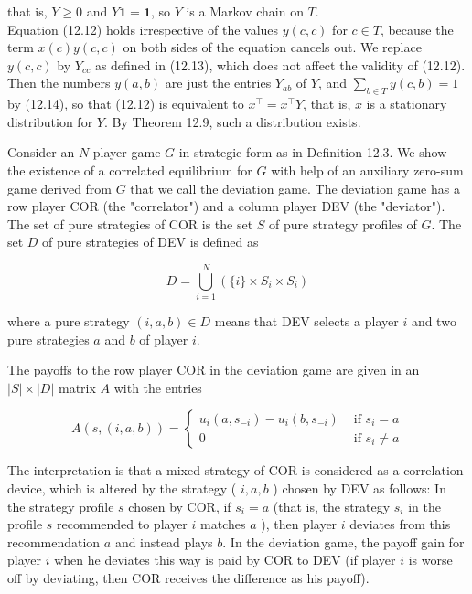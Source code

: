 \documentclass[12pt]{article}
\begin{document}
that is, $Y \geq 0$ and $Y \mathbf{1}=\mathbf{1}$, so $Y$ is a Markov chain on $T$.\\
Equation (12.12) holds irrespective of the values $y(c, c)$ for $c \in T$, because the term $x(c) y(c, c)$ on both sides of the equation cancels out. We replace $y(c, c)$ by $Y_{c c}$ as defined in (12.13), which does not affect the validity of (12.12). Then the numbers $y(a, b)$ are just the entries $Y_{a b}$ of $Y$, and $\sum_{b \in T} y(c, b)=1$ by (12.14), so that (12.12) is equivalent to $x^{\top}=x^{\top} Y$, that is, $x$ is a stationary distribution for $Y$. By Theorem 12.9, such a distribution exists.

Consider an $N$-player game $G$ in strategic form as in Definition 12.3. We show the existence of a correlated equilibrium for $G$ with help of an auxiliary zero-sum\\
game derived from $G$ that we call the deviation game. The deviation game has a row player COR (the "correlator") and a column player DEV (the "deviator"). The set of pure strategies of COR is the set $S$ of pure strategy profiles of $G$. The set $D$ of pure strategies of DEV is defined as


\begin{equation*}
D=\bigcup_{i=1}^{N}\left(\{i\} \times S_{i} \times S_{i}\right) \tag{12.15}
\end{equation*}


where a pure strategy $(i, a, b) \in D$ means that DEV selects a player $i$ and two pure strategies $a$ and $b$ of player $i$.

The payoffs to the row player COR in the deviation game are given in an $|S| \times|D|$ matrix $A$ with the entries

\[
A(s,(i, a, b))= \begin{cases}u_{i}\left(a, s_{-i}\right)-u_{i}\left(b, s_{-i}\right) & \text { if } s_{i}=a  \tag{12.16}\\ 0 & \text { if } s_{i} \neq a\end{cases}
\]

The interpretation is that a mixed strategy of COR is considered as a correlation device, which is altered by the strategy ( $i, a, b$ ) chosen by DEV as follows: In the strategy profile $s$ chosen by COR, if $s_{i}=a$ (that is, the strategy $s_{i}$ in the profile $s$ recommended to player $i$ matches $a$ ), then player $i$ deviates from this recommendation $a$ and instead plays $b$. In the deviation game, the payoff gain for player $i$ when he deviates this way is paid by COR to DEV (if player $i$ is worse off by deviating, then COR receives the difference as his payoff).
\end{document}
